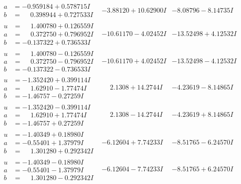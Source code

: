\documentclass[1p]{elsarticle_modified}
\theoremstyle{definition}
\begin{document}
$$\begin{array}{c|c|c}
\begin{aligned}
a &= -0.959184 + 0.578715 I \\
b &= \phantom{-}0.398944 + 0.727533 I\end{aligned}
 & -3.88120 + 10.62900 I & -8.08796 - 8.14735 I \\ \hline\begin{aligned}
u &= \phantom{-}1.400780 + 0.126559 I \\
a &= \phantom{-}0.372750 + 0.796952 I \\
b &= -0.137322 + 0.736533 I\end{aligned}
 & -10.61170 - 4.02452 I & -13.52498 + 4.12532 I \\ \hline\begin{aligned}
u &= \phantom{-}1.400780 - 0.126559 I \\
a &= \phantom{-}0.372750 - 0.796952 I \\
b &= -0.137322 - 0.736533 I\end{aligned}
 & -10.61170 + 4.02452 I & -13.52498 - 4.12532 I \\ \hline\begin{aligned}
u &= -1.352420 + 0.399114 I \\
a &= \phantom{-}1.62910 - 1.77474 I \\
b &= -1.46757 - 0.27259 I\end{aligned}
 & \phantom{-}2.1308 + 14.2744 I & -4.23619 - 8.14865 I \\ \hline\begin{aligned}
u &= -1.352420 - 0.399114 I \\
a &= \phantom{-}1.62910 + 1.77474 I \\
b &= -1.46757 + 0.27259 I\end{aligned}
 & \phantom{-}2.1308 - 14.2744 I & -4.23619 + 8.14865 I \\ \hline\begin{aligned}
u &= -1.40349 + 0.18980 I \\
a &= -0.55401 + 1.37979 I \\
b &= \phantom{-}1.301280 + 0.292342 I\end{aligned}
 & -6.12604 + 7.74233 I & -8.51765 - 6.24570 I \\ \hline\begin{aligned}
u &= -1.40349 - 0.18980 I \\
a &= -0.55401 - 1.37979 I \\
b &= \phantom{-}1.301280 - 0.292342 I\end{aligned}
 & -6.12604 - 7.74233 I & -8.51765 + 6.24570 I \\ \hline\begin{aligned}

\end{aligned}
\end{array}$$
\end{document}
